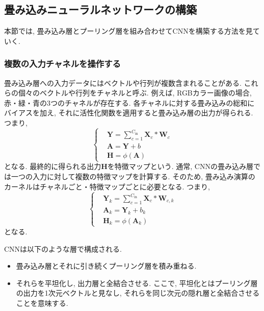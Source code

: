 \documentclass[uplatex]{jsarticle}
\theoremstyle{definition}
\numberwithin{equation}{section}
\begin{document}
\subsection{畳み込みニューラルネットワークの構築}
本節では, 畳み込み層とプーリング層を組み合わせてCNNを構築する方法を見ていく.

\subsubsection{複数の入力チャネルを操作する}
畳み込み層への入力データにはベクトルや行列が複数含まれることがある.
これらの個々のベクトルや行列をチャネルと呼ぶ.
例えば, RGBカラー画像の場合, 赤・緑・青の3つのチャネルが存在する.
各チャネルに対する畳み込みの総和にバイアスを加え, それに活性化関数を適用すると畳み込み層の出力が得られる.
つまり, 
\begin{equation}
    \left\{
    \begin{aligned}
        &\bm{Y} = \sum_{c = 1}^{C_{\mathrm{in}}} \bm{X}_{c} * \bm{W}_{c} \\
        &\bm{A} = \bm{Y} + b \\
        &\bm{H} = \phi(\bm{A})
    \end{aligned}
    \right.
\end{equation}
となる.
最終的に得られる出力$\bm{H}$を特徴マップという.
通常, CNNの畳み込み層では一つの入力に対して複数の特徴マップを計算する.
そのため, 畳み込み演算のカーネルはチャネルごと・特徴マップごとに必要となる.
つまり, 
\begin{equation}
    \left\{
    \begin{aligned}
        &\bm{Y}_{k} = \sum_{c = 1}^{C_{\mathrm{in}}} \bm{X}_{c} * \bm{W}_{c, k} \\
        &\bm{A}_{k} = \bm{Y}_{k} + b_{k} \\
        &\bm{H}_{k} = \phi(\bm{A}_{k})
    \end{aligned}
    \right.
\end{equation}
となる.

CNNは以下のような層で構成される.
\begin{itemize}
    \item
    畳み込み層とそれに引き続くプーリング層を積み重ねる.

    \item
    それらを平坦化し, 出力層と全結合させる.
    ここで, 平坦化とはプーリング層の出力を1次元ベクトルと見なし, それらを同じ次元の隠れ層と全結合させることを意味する.
\end{itemize}
\end{document}
